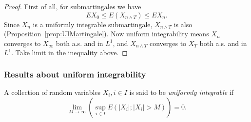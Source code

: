 \begin{proof}
	First of all, for submartingales we have
	\[
		E X_0 \le  E(X_{n \wedge T}) \le  E X_n
	.\] 
	Since $X_n$ is a uniformly integrable submartingale, $X_{n \wedge T}$ is also (Proposition~\ref{prop:UIMartingale}). Now uniform integrability means $X_n$ converges to $X_\infty $ both a.s. and in $L^1$, and $X_{n \wedge T}$ converges to $X_T$ both a.s. and in $L^1$. Take limit in the inequality above.
\end{proof}

\subsubsection{Results about uniform integrability}

\begin{definition}
	A collection of random variables $X_i, i \in I$ is said to be \textit{uniformly integrable} if
	\[
		\lim_{M \to \infty } \left( \sup _{i \in I} E\left( |X_i| ; |X_i| > M \right)  \right)  = 0
	.\] 
\end{definition}


